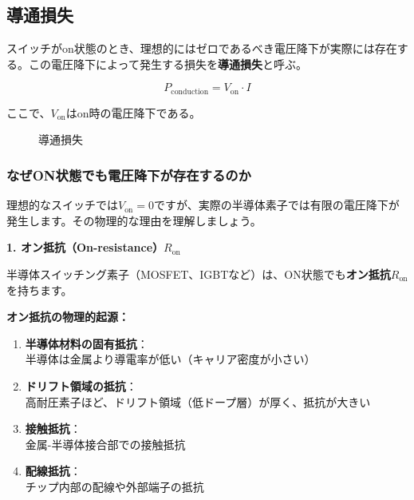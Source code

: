 \subsection{導通損失}

スイッチがon状態のとき、理想的にはゼロであるべき電圧降下が実際には存在する。この電圧降下によって発生する損失を\textbf{導通損失}と呼ぶ。

\begin{equation}
P_{\text{conduction}} = V_{\text{on}} \cdot I
\end{equation}

ここで、$V_{\text{on}}$はon時の電圧降下である。

\begin{figure}[H]
\centering
{}
\caption{導通損失}
\label{fig:conduction_loss}
\end{figure}

\subsubsection{なぜON状態でも電圧降下が存在するのか}

理想的なスイッチでは$V_{\text{on}} = 0$ですが、実際の半導体素子では有限の電圧降下が発生します。その物理的な理由を理解しましょう。

\textbf{1. オン抵抗（On-resistance）$R_{\text{on}}$}

半導体スイッチング素子（MOSFET、IGBTなど）は、ON状態でも\textbf{オン抵抗}$R_{\text{on}}$を持ちます。

\begin{screen}
\textbf{オン抵抗の物理的起源：}

\begin{enumerate}
\item \textbf{半導体材料の固有抵抗}：\\
半導体は金属より導電率が低い（キャリア密度が小さい）

\item \textbf{ドリフト領域の抵抗}：\\
高耐圧素子ほど、ドリフト領域（低ドープ層）が厚く、抵抗が大きい

\item \textbf{接触抵抗}：\\
金属-半導体接合部での接触抵抗

\item \textbf{配線抵抗}：\\
チップ内部の配線や外部端子の抵抗
\end{enumerate}
\end{screen}

